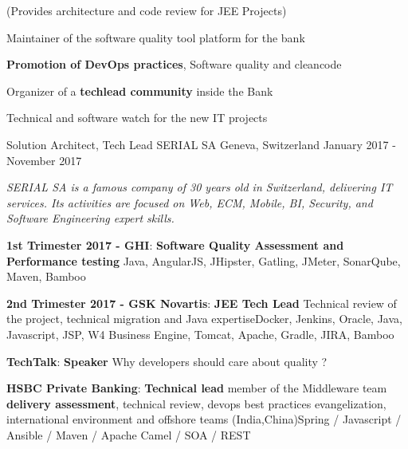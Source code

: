 \begin{cventries}
{\begin{cvitems}
            \item(Provides architecture and code review for JEE Projects)
            \item {Maintainer of the software quality tool platform for the bank}
            \item {\textbf{Promotion of DevOps practices}, Software quality and cleancode}
            \item {Organizer of a \textbf{techlead community }inside the Bank}
            \item {Technical and software watch for the new IT projects}
        \end{cvitems}
    }
    \cventry
    {Solution Architect, Tech Lead} %
    {SERIAL SA} %
    {Geneva, Switzerland} %
    {January 2017 - November 2017} %
    {
        \begin{cvitems} %
            \item {\textit{SERIAL SA is a famous company of 30 years old in Switzerland, delivering IT services. Its activities are focused on Web, ECM, Mobile, BI, Security, and Software Engineering expert skills.}}
            \item { \textbf{1st Trimester 2017 - GHI}: \textbf{Software Quality Assessment and Performance testing} \newline Java, AngularJS, JHipster, Gatling, JMeter, SonarQube, Maven, Bamboo}
            \item { \textbf{2nd Trimester 2017 - GSK Novartis}: \textbf{JEE Tech Lead} \newline Technical review of the project, technical migration and Java expertise\newline Docker, Jenkins, Oracle, Java, Javascript, JSP, W4 Business Engine, Tomcat, Apache, Gradle, JIRA, Bamboo}
            \item { \textbf{TechTalk}: \textbf{Speaker} \newline Why developers should care about quality ?}
            \item { \textbf{HSBC Private Banking}: \textbf{Technical lead} \newline member of the Middleware team  \textbf{delivery assessment}, technical review, devops best practices evangelization, international environment and offshore teams (India,China)\newline Spring / Javascript / Ansible / Maven / Apache Camel / SOA / REST}
        \end{cvitems}
    }


\end{cventries}
